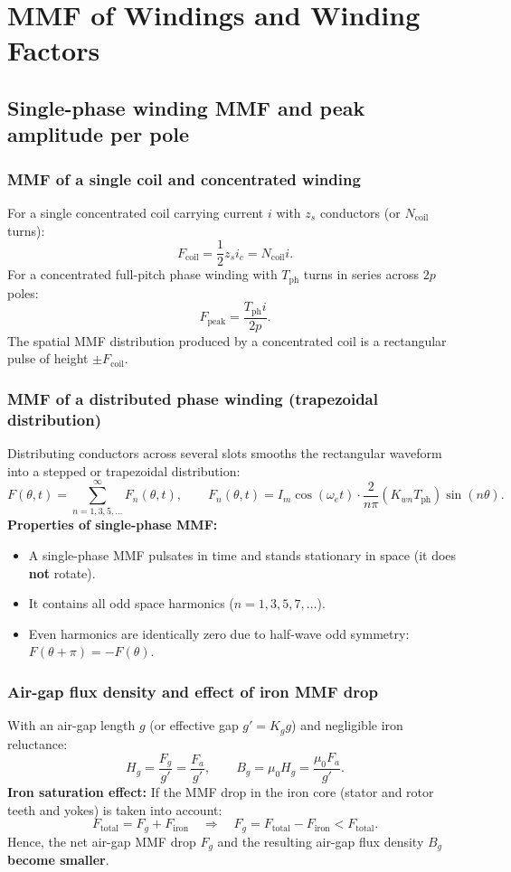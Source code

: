 \section{MMF of Windings and Winding Factors}

\subsection{Single-phase winding MMF and peak amplitude per pole}

\subsubsection{MMF of a single coil and concentrated winding}
For a single concentrated coil carrying current \(i\) with \(z_s\) conductors (or \(N_{\mathrm{coil}}\) turns):
\[
F_{\mathrm{coil}} = \frac{1}{2} z_s i_c = N_{\mathrm{coil}} i.
\]
For a concentrated full-pitch phase winding with \(T_{\mathrm{ph}}\) turns in series across \(2p\) poles:
\[
F_{\mathrm{peak}} = \frac{T_{\mathrm{ph}} i}{2p}.
\]
The spatial MMF distribution produced by a concentrated coil is a rectangular pulse of height \(\pm F_{\mathrm{coil}}\).

\subsubsection{MMF of a distributed phase winding (trapezoidal distribution)}
Distributing conductors across several slots smooths the rectangular waveform into a stepped or trapezoidal distribution:
\[
F(\theta, t) = \sum_{n=1,3,5,\dots}^\infty F_n(\theta, t),
\qquad
F_n(\theta, t) = I_m \cos(\omega_e t) \cdot \frac{2}{n\pi} (K_{wn} T_{\mathrm{ph}}) \sin(n\theta).
\]
\textbf{Properties of single-phase MMF:}
\begin{itemize}
  \item A single-phase MMF pulsates in time and stands stationary in space (it does \textbf{not} rotate).
  \item It contains all odd space harmonics (\(n = 1, 3, 5, 7, \dots\)).
  \item Even harmonics are identically zero due to half-wave odd symmetry: \(F(\theta + \pi) = -F(\theta)\).
\end{itemize}

\subsubsection{Air-gap flux density and effect of iron MMF drop}
With an air-gap length \(g\) (or effective gap \(g'=K_g g\)) and negligible iron reluctance:
\[
H_g = \frac{F_g}{g'} = \frac{F_a}{g'},
\qquad
B_g = \mu_0 H_g = \frac{\mu_0 F_a}{g'}.
\]
\textbf{Iron saturation effect:} If the MMF drop in the iron core (stator and rotor teeth and yokes) is taken into account:
\[
F_{\mathrm{total}} = F_g + F_{\mathrm{iron}}
\quad\Rightarrow\quad
F_g = F_{\mathrm{total}} - F_{\mathrm{iron}} < F_{\mathrm{total}}.
\]
Hence, the net air-gap MMF drop \(F_g\) and the resulting air-gap flux density \(B_g\) \textbf{become smaller}.

